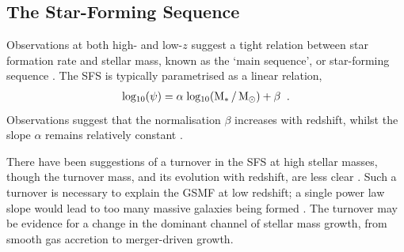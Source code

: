 \subsection{The Star-Forming Sequence}
\label{sec:results:sfs}

Observations at both high- and low-$z$ suggest a tight relation between star formation rate and stellar mass, known as the `main sequence', or star-forming sequence \citep[SFS,][]{brinchmann_physical_2004,noeske_star_2007,speagle_highly_2014}.
The SFS is typically parametrised as a linear relation,
\begin{align}
  \mathrm{log_{10}(\psi)} = \alpha \; \mathrm{log_{10}(M_{*}\,/\, M_{\odot})} + \beta\;\;.
\end{align}
Observations suggest that the normalisation $\beta$ increases with redshift, whilst the slope $\alpha$ remains relatively constant \citep{daddi_multiwavelength_2007, santini_star_2009, salmon_relation_2015}.


There have been suggestions of a turnover in the SFS at high stellar masses, though the turnover mass, and its evolution with redshift, are less clear \protect\citep{lee_turnover_2015,tasca_evolving_2015,santini_star_2017}.
Such a turnover is necessary to explain the GSMF at low redshift; a single power law slope would lead to too many massive galaxies being formed \citep[between $10^{10} < \mathrm{M_{*}/M_{\odot} < 10^{11}}$,][]{leja_reconciling_2015}.
The turnover may be evidence for a change in the dominant channel of stellar mass growth, from smooth gas accretion to merger-driven growth.

